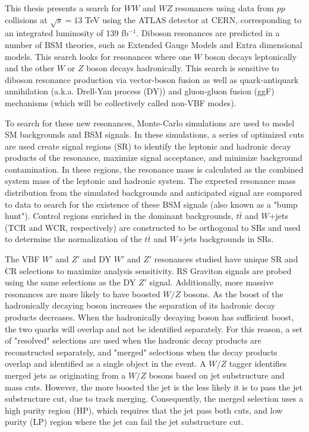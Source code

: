 This thesis presents a search for $WW$ and $WZ$ resonances using data from $pp$ collisions at $\sqrt{s}=13$ TeV using the ATLAS detector at CERN, corresponding to an integrated luminosity of 139 fb$^{-1}$. Diboson resonances are predicted in a number of BSM theories, such as Extended Gauge Models and Extra dimensional models. This search looks for resonances where one $W$ boson decays leptonically and the other $W$ or $Z$ boson decays hadronically. This search is sensitive to diboson resonance production via vector-boson fusion as well as quark-antiquark annihilation (a.k.a. Drell-Yan process (DY)) and gluon-gluon fusion (ggF) mechanisms (which will be collectively called non-VBF modes).

To search for these new resonances, Monte-Carlo simulations are used to model SM backgrounds and BSM signals. In these simulations, a series of optimized cuts are used create signal regions (SR) to identify the leptonic and hadronic decay products of the resonance, maximize signal acceptance, and minimize background contamination. In these regions, the resonance mass is calculated as the combined system mass of the leptonic and hadronic system. The expected resonance mass distribution from the simulated backgrounds and anticipated signal are compared to data to search for the existence of these BSM signals (also known as a "bump hunt"). Control regions enriched in the dominant backgrounds, $t\bar{t}$ and $W$+jets (TCR and WCR, respectively) are constructed to be orthogonal to SRs and used to determine the normalization of the $t\bar{t}$ and $W$+jets backgrounds in SRs.

The VBF $W'$ and $Z'$ and DY $W'$ and $Z'$ resonances studied have unique SR and CR selections to maximize analysis sensitivity. RS Graviton signals are probed using the same selections as the DY $Z'$ signal. Additionally, more massive resonances are more likely to have boosted $W/Z$ bosons. As the boost of the hadronically decaying boson increases the separation of its hadronic decay products decreases. When the hadronically decaying boson has sufficient boost, the two quarks will overlap and not be identified separately. For this reason, a set of "resolved" selections are used when the hadronic decay products are reconstructed separately, and "merged" selections when the decay products overlap and identified as a single object in the event. A $W/Z$ tagger identifies merged jets as originating from a $W/Z$ bosons based on jet substructure and mass cuts. However, the more boosted the jet is the less likely it is to pass the jet substructure cut, due to track merging. Consequently, the merged selection uses a high purity region (HP), which requires that the jet pass both cuts, and low purity (LP) region where the jet can fail the jet substructure cut. 

